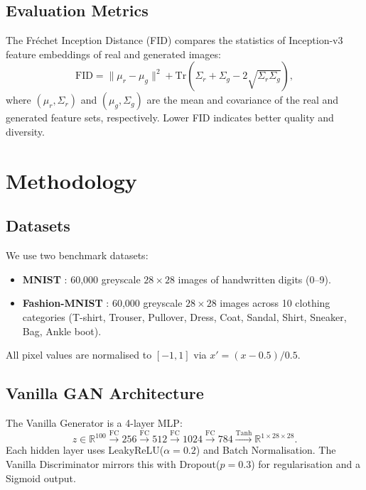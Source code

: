 \documentclass[conference]{IEEEtran}
\begin{document}
\subsection{Evaluation Metrics}
The Fréchet Inception Distance (FID) \cite{heusel2017fid} compares the statistics of Inception-v3 \cite{szegedy2016inception} feature embeddings of real and generated images:
\begin{equation}
\text{FID} = \|\mu_r - \mu_g\|^2 + \mathrm{Tr}\!\left(\Sigma_r + \Sigma_g - 2\sqrt{\Sigma_r \Sigma_g}\right),
\end{equation}
where $(\mu_r, \Sigma_r)$ and $(\mu_g, \Sigma_g)$ are the mean and covariance of the real and generated feature sets, respectively. Lower FID indicates better quality and diversity.

\section{Methodology}
\label{sec:method}

\subsection{Datasets}
We use two benchmark datasets:
\begin{itemize}
    \item \textbf{MNIST} \cite{lecun1998mnist}: 60{,}000 greyscale $28{\times}28$ images of handwritten digits (0--9).
    \item \textbf{Fashion-MNIST} \cite{xiao2017fashionmnist}: 60{,}000 greyscale $28{\times}28$ images across 10 clothing categories (T-shirt, Trouser, Pullover, Dress, Coat, Sandal, Shirt, Sneaker, Bag, Ankle boot).
\end{itemize}
All pixel values are normalised to $[-1, 1]$ via $x' = (x - 0.5) / 0.5$.

\subsection{Vanilla GAN Architecture}
The Vanilla Generator is a 4-layer MLP:
\[z \in \mathbb{R}^{100} \xrightarrow{\text{FC}} 256 \xrightarrow{\text{FC}} 512 \xrightarrow{\text{FC}} 1024 \xrightarrow{\text{FC}} 784 \xrightarrow{\text{Tanh}} \mathbb{R}^{1\times28\times28}.\]
Each hidden layer uses LeakyReLU($\alpha=0.2$) and Batch Normalisation. The Vanilla Discriminator mirrors this with Dropout($p=0.3$) for regularisation and a Sigmoid output.
\end{document}
